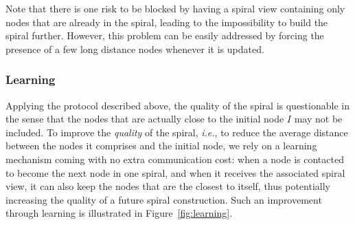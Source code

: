 Note that there is one risk to be blocked by having a spiral view containing only nodes
that are already in the spiral, leading to the impossibility to build the spiral
further. However, this problem can be easily addressed by forcing the presence of a few
long distance nodes whenever it is updated.

\subsubsection*{Learning}

Applying the protocol described above, the quality of the spiral is questionable in the
sense that the nodes that are actually close to the initial node $I$ may not be
included.%
%
To improve the \emph{quality} of the spiral, \emph{i.e.}, to reduce the average distance
between the nodes it comprises and the initial node, we rely on a learning mechanism
coming with no extra communication cost: when a node is contacted to become the next node
in one spiral, and when it receives the associated spiral view, it can also keep the nodes
that are the closest to itself, thus potentially increasing the quality of a future spiral
construction. Such an improvement through learning is illustrated in
Figure~\ref{fig:learning}.

